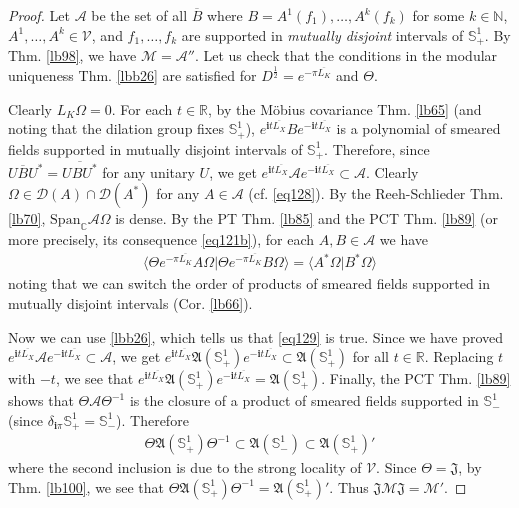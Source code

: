 \documentclass[12pt,b5paper,notitlepage]{article}
\theoremstyle{definition}
\theoremstyle{plain}
\newcommand{\fk}{\mathfrak}
\newcommand{\mc}{\mathcal}
\newcommand{\ovl}{\overline}
\newcommand{\Dom}{\scr{D}}
\newcommand{\Span}{\mathrm{Span}}
\newcommand{\bk}[1]{\langle {#1}\rangle}
\newcommand{\scr}{\mathscr}
\newcommand{\im}{\mathbf{i}}
\newcommand{\Cbb}{\mathbb C}
\newcommand{\Nbb}{\mathbb N}
\newcommand{\Rbb}{\mathbb R}
\newcommand{\Sbb}{{\mathbb S}}
\newcommand{\MV}{\mathcal V}
\numberwithin{equation}{section}
\begin{document}
\begin{proof}
Let $\scr A$ be the set of all $\ovl B$ where $B=A^1(f_1),\dots,A^k(f_k)$ for some $k\in\Nbb$, $A^1,\dots,A^k\in\MV$, and $f_1,\dots,f_k$ are supported in \textit{mutually disjoint} intervals of $\Sbb^1_+$. By Thm. \ref{lb98}, we have $\mc M=\scr A''$. Let us check that the conditions in the modular uniqueness Thm. \ref{lbb26} are satisfied for $D^{\frac 12}=e^{-\pi\ovl{L_K}}$ and $\Theta$. 

Clearly $L_K\Omega=0$. For each $t\in\Rbb$, by the M\"obius covariance Thm. \ref{lb65} (and noting that the dilation group fixes $\Sbb^1_+$),  $e^{\im t\ovl{L_X}} Be^{-\im t\ovl{L_X}}$ is a polynomial of smeared fields supported in mutually disjoint intervals of $\Sbb^1_+$. Therefore, since $U\ovl B U^*=\ovl{UBU^*}$ for any unitary $U$, we get $e^{\im t\ovl{L_X}}\scr Ae^{-\im t\ovl{L_X}}\subset\scr A$. Clearly $\Omega\in\Dom(A)\cap\Dom(A^*)$ for any $A\in\scr A$ (cf. \eqref{eq128}). By the Reeh-Schlieder Thm. \ref{lb70}, $\Span_\Cbb\scr A\Omega$ is dense. By the PT Thm. \ref{lb85} and the PCT Thm. \ref{lb89} (or more precisely, its consequence \eqref{eq121b}), for each $A,B\in\scr A$ we have
\begin{align*}
\bk{\Theta e^{-\pi\ovl{L_K}}A\Omega|\Theta e^{-\pi\ovl{L_K}}B\Omega}=\bk{A^*\Omega|B^*\Omega}
\end{align*}
noting that we can switch the order of products of smeared fields supported in mutually disjoint intervals (Cor. \ref{lb66}). 

Now we can use \ref{lbb26}, which tells us that \eqref{eq129} is true. Since we have proved $e^{\im t\ovl{L_X}}\scr Ae^{-\im t\ovl{L_X}}\subset\scr A$, we get $e^{\im t\ovl{L_X}}\fk A(\Sbb^1_+)e^{-\im t\ovl{L_X}}\subset\fk A(\Sbb^1_+)$ for all $t\in\Rbb$. Replacing $t$ with $-t$, we see that $e^{\im t\ovl{L_X}}\fk A(\Sbb^1_+)e^{-\im t\ovl{L_X}}=\fk A(\Sbb^1_+)$. Finally, the PCT Thm. \ref{lb89} shows that $\Theta\scr A\Theta^{-1}$ is the closure of a product of smeared fields supported in $\Sbb^1_-$ (since $\delta_{\im\pi}\Sbb^1_+=\Sbb^1_-$). Therefore 
\begin{align}\label{eq130}
\Theta\fk A(\Sbb^1_+)\Theta^{-1}\subset\fk A(\Sbb^1_-)\subset\fk A(\Sbb^1_+)'
\end{align}
where the second inclusion is due to the strong locality of $\MV$. Since $\Theta=\fk J$, by Thm. \ref{lb100}, we see that $\Theta\fk A(\Sbb^1_+)\Theta^{-1}=\fk A(\Sbb^1_+)'$. Thus $\fk J\mc M\fk J=\mc M'$.
\end{proof}
\end{document}
